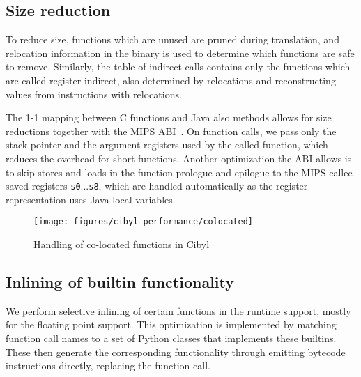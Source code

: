 \subsection{Size reduction}
To reduce size, functions which are unused are pruned during translation, and
relocation information in the binary is used to determine which functions are
safe to remove. Similarly, the table of indirect calls contains only the
functions which are called register-indirect, also determined by relocations
and reconstructing values from instructions with relocations.

The 1-1 mapping between C functions and Java also methods allows for size
reductions together with the MIPS ABI~\cite{sco96mipsabi}. On function calls,
we pass only the stack pointer and the argument registers used by the called
function, which reduces the overhead for short functions. Another optimization
the ABI allows is to skip stores and loads in the function prologue and
epilogue to the MIPS callee-saved registers \texttt{s0}...\texttt{s8}, which
are handled automatically as the register representation uses Java local
variables.


\begin{figure*}[thb]
  \begin{center}
    \texttt{[image: figures/cibyl-performance/colocated]}
    \caption{Handling of co-located functions in Cibyl}
    \label{fig:cp:colocated}
  \end{center}
\end{figure*}

\subsection{Inlining of builtin functionality}
We perform selective inlining of certain functions in the runtime support,
mostly for the floating point support. This optimization is implemented by
matching function call names to a set of Python classes that implements these
builtins. These then generate the corresponding functionality through
emitting bytecode instructions directly, replacing the function call.

